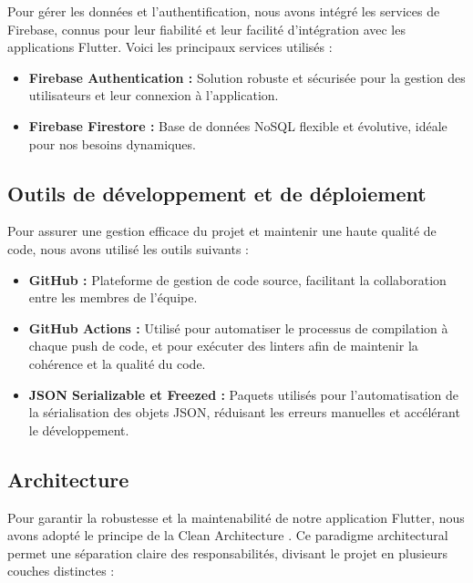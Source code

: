Pour gérer les données et l'authentification, nous avons intégré les services de Firebase, connus pour leur fiabilité et leur facilité d'intégration avec les applications Flutter. Voici les principaux services utilisés :

\begin{itemize}[noitemsep]
    \item \textbf{Firebase Authentication :} Solution robuste et sécurisée pour la gestion des utilisateurs et leur connexion à l'application.
    \item \textbf{Firebase Firestore :} Base de données NoSQL flexible et évolutive, idéale pour nos besoins dynamiques.
\end{itemize}

\subsection{Outils de développement et de déploiement}

Pour assurer une gestion efficace du projet et maintenir une haute qualité de code, nous avons utilisé les outils suivants :

\begin{itemize}[noitemsep]
    \item \textbf{GitHub :} Plateforme de gestion de code source, facilitant la collaboration entre les membres de l'équipe.
    \item \textbf{GitHub Actions :} Utilisé pour automatiser le processus de compilation à chaque push de code, et pour exécuter des linters afin de maintenir la cohérence et la qualité du code.
    \item \textbf{JSON Serializable et Freezed :} Paquets utilisés pour l'automatisation de la sérialisation des objets JSON, réduisant les erreurs manuelles et accélérant le développement.
\end{itemize}

\subsection{Architecture}
\label{sec:architecture}

Pour garantir la robustesse et la maintenabilité de notre application Flutter, nous avons adopté le principe de la Clean Architecture \cite{cleanArchitecture}. Ce paradigme architectural permet une séparation claire des responsabilités, divisant le projet en plusieurs couches distinctes :

